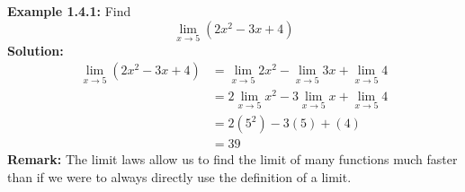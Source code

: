 \documentclass{article}
\begin{document}
	\textbf{Example 1.4.1:} Find
	$$\lim_{x \to 5}{(2x^2 - 3x + 4)}$$
	\textbf{Solution:}
	\begin{align*}
		\lim_{x \to 5}{(2x^2 - 3x + 4)} &= \lim_{x \to 5}{2x^2} - \lim_{x \to 5}{3x} + \lim_{x \to 5}{4} \tag{Thrm 1.4.1, 1.4.4} \\
		           &= 2\lim_{x \to 5}{x^2} - 3\lim_{x \to 5}{x} + \lim_{x \to 5}{4} \tag{Thrm 1.4.3} \\
		           &= 2(5^2) - 3(5) + (4) \tag{Thrm 1.3.2, 1.3.3, 1.4.6} \\
		           &= 39
	\end{align*}
	\textbf{Remark:} The limit laws allow us to find the limit of many functions much faster than if we were to always directly use the definition of a limit.
\end{document}
